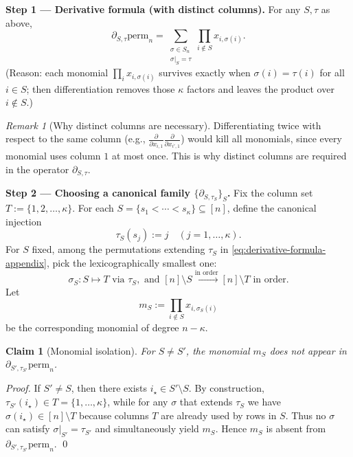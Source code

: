 \documentclass[12pt]{article}
\newtheorem{claim}[theorem]{Claim}
\theoremstyle{definition}
\theoremstyle{definition}
\theoremstyle{remark}
\newtheorem{remark}{Remark}
\theoremstyle{remark}
\begin{document}
\textbf{Step 1 --- Derivative formula (with distinct columns).}
For any $S, \tau$ as above,
\begin{equation}\label{eq:derivative-formula-appendix}
\partial_{S,\tau} \mathrm{perm}_n = \sum_{\substack{\sigma \in S_n \\ \sigma|_S = \tau}} \prod_{i \notin S} x_{i,\sigma(i)}.
\end{equation}
(Reason: each monomial $\prod_i x_{i,\sigma(i)}$ survives exactly when $\sigma(i) = \tau(i)$ for all $i \in S$; then differentiation removes those $\kappa$ factors and leaves the product over $i \notin S$.)

\begin{remark}[Why distinct columns are necessary]
Differentiating twice with respect to the same column (e.g., $\frac{\partial}{\partial x_{i,1}} \frac{\partial}{\partial x_{i',1}}$) would kill all monomials, since every monomial uses column $1$ at most once. This is why distinct columns are required in the operator $\partial_{S,\tau}$.
\end{remark}

\textbf{Step 2 --- Choosing a canonical family $\{\partial_{S,\tau_S}\}_S$.}
Fix the column set $T := \{1,2,\ldots,\kappa\}$.
For each $S = \{s_1 < \cdots < s_\kappa\} \subseteq [n]$, define the canonical injection
\[
\tau_S(s_j) := j \quad (j = 1,\ldots,\kappa).
\]
For $S$ fixed, among the permutations extending $\tau_S$ in \eqref{eq:derivative-formula-appendix}, pick the lexicographically smallest one:
\[
\sigma_S : S \mapsto T \text{ via } \tau_S, \text{ and } [n] \setminus S \xrightarrow{\text{in order}} [n] \setminus T \text{ in order}.
\]
Let
\[
m_S := \prod_{i \notin S} x_{i,\sigma_S(i)}
\]
be the corresponding monomial of degree $n - \kappa$.

\begin{claim}[Monomial isolation]
For $S \neq S'$, the monomial $m_S$ does not appear in $\partial_{S',\tau_{S'}} \mathrm{perm}_n$.
\end{claim}

\begin{proof}
If $S' \neq S$, then there exists $i_\star \in S' \setminus S$.
By construction, $\tau_{S'}(i_\star) \in T = \{1,\ldots,\kappa\}$, while for any $\sigma$ that extends $\tau_S$ we have $\sigma(i_\star) \in [n] \setminus T$ because columns $T$ are already used by rows in $S$.
Thus no $\sigma$ can satisfy $\sigma|_{S'} = \tau_{S'}$ and simultaneously yield $m_S$.
Hence $m_S$ is absent from $\partial_{S',\tau_{S'}} \mathrm{perm}_n$. \qed
\end{proof}
\end{document}
